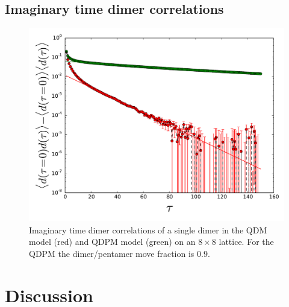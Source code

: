 \documentclass[aps,floatfix,11pt,twocolumn]{revtex4-1}
\begin{document}
    \subsection{Imaginary time dimer correlations}
    \begin{figure}[htpb]
        \centering
        \includegraphics[width=0.8\linewidth]{dimer_origin_time_cor.pdf}
        \caption{Imaginary time dimer correlations of a single dimer in the QDM model (red) and QDPM
        model (green) on an $8\times8$ lattice. For the QDPM the dimer/pentamer move fraction is $0.9$. }
        \label{fig:}

    \end{figure}

\section{Discussion}
\end{document}
